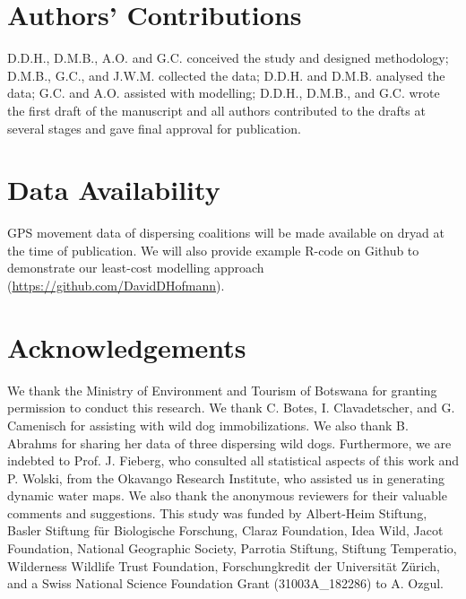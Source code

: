 \documentclass[abstract=on,10pt,a4paper,bibliography=totocnumbered]{article}
\begin{document}
\section{Authors' Contributions}
D.D.H., D.M.B., A.O. and G.C. conceived the study and designed methodology;
D.M.B., G.C., and J.W.M. collected the data; D.D.H. and D.M.B. analysed the
data; G.C. and A.O. assisted with modelling; D.D.H., D.M.B., and G.C. wrote the
first draft of the manuscript and all authors contributed to the drafts at
several stages and gave final approval for publication.

\section{Data Availability}
GPS movement data of dispersing coalitions will be made available on dryad at
the time of publication. We will also provide example R-code on Github to
demonstrate our least-cost modelling approach
(\url{https://github.com/DavidDHofmann}).

\section{Acknowledgements}
We thank the Ministry of Environment and Tourism of Botswana for granting
permission to conduct this research. We thank C. Botes, I. Clavadetscher, and G.
Camenisch for assisting with wild dog immobilizations. We also thank B. Abrahms
for sharing her data of three dispersing wild dogs. Furthermore, we are indebted
to Prof. J. Fieberg, who consulted all statistical aspects of this work and P.
Wolski, from the Okavango Research Institute, who assisted us in generating
dynamic water maps. We also thank the anonymous reviewers for their valuable
comments and suggestions. This study was funded by Albert-Heim Stiftung, Basler
Stiftung für Biologische Forschung, Claraz Foundation, Idea Wild, Jacot
Foundation, National Geographic Society, Parrotia Stiftung, Stiftung Temperatio,
Wilderness Wildlife Trust Foundation, Forschungkredit der Universität Zürich,
and a Swiss National Science Foundation Grant (31003A\_182286) to A. Ozgul.

\newpage
\begingroup
\singlespacing

\endgroup
\end{document}
